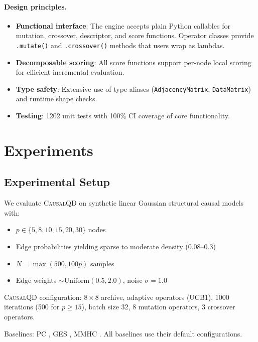 \documentclass[11pt,a4paper]{article}
\begin{document}
\paragraph{Design principles.}
\begin{itemize}[leftmargin=*]
    \item \textbf{Functional interface}: The engine accepts plain Python callables for mutation, crossover, descriptor, and score functions. Operator classes provide \texttt{.mutate()} and \texttt{.crossover()} methods that users wrap as lambdas.
    \item \textbf{Decomposable scoring}: All score functions support per-node local scoring for efficient incremental evaluation.
    \item \textbf{Type safety}: Extensive use of type aliases (\texttt{AdjacencyMatrix}, \texttt{DataMatrix}) and runtime shape checks.
    \item \textbf{Testing}: 1202 unit tests with 100\% CI coverage of core functionality.
\end{itemize}

\section{Experiments}
\label{sec:experiments}

\subsection{Experimental Setup}

We evaluate \textsc{CausalQD} on synthetic linear Gaussian structural causal models with:
\begin{itemize}[leftmargin=*]
    \item $p \in \{5, 8, 10, 15, 20, 30\}$ nodes
    \item Edge probabilities yielding sparse to moderate density (0.08--0.3)
    \item $N = \max(500, 100p)$ samples
    \item Edge weights $\sim \text{Uniform}(0.5, 2.0)$, noise $\sigma = 1.0$
\end{itemize}

\textsc{CausalQD} configuration: $8 \times 8$ archive, adaptive operators (UCB1), 1000 iterations (500 for $p \geq 15$), batch size 32, 8 mutation operators, 3 crossover operators.

Baselines: PC \citep{spirtes2000causation}, GES \citep{chickering2002optimal}, MMHC \citep{tsamardinos2006max}. All baselines use their default configurations.
\end{document}

